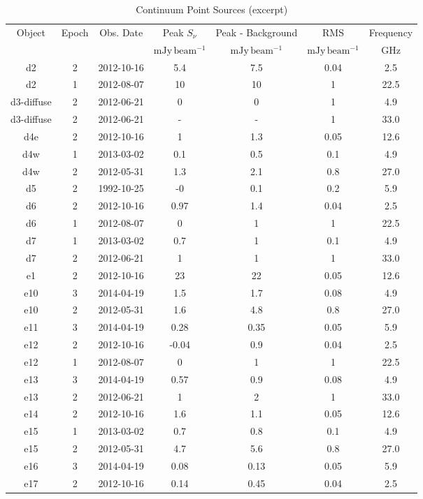 \begin{table*}[htp]
\caption{Continuum Point Sources (excerpt)}
\begin{tabular}{ccccccc}
\label{tab:contsrcs}
Object & Epoch & Obs. Date & Peak $S_{\nu}$ & Peak - Background & RMS & Frequency \\
 &  &  & $\mathrm{mJy\,beam^{-1}}$ & $\mathrm{mJy\,beam^{-1}}$ & $\mathrm{mJy\,beam^{-1}}$ & $\mathrm{GHz}$ \\
\hline
d2 & 2 & 2012-10-16 & 5.4 & 7.5 & 0.04 & 2.5 \\
d2 & 1 & 2012-08-07 & 10 & 10 & 1 & 22.5 \\
d3-diffuse & 2 & 2012-06-21 & 0 & 0 & 1 & 4.9 \\
d3-diffuse & 2 & 2012-06-21 & - & - & 1 & 33.0 \\
d4e & 2 & 2012-10-16 & 1 & 1.3 & 0.05 & 12.6 \\
d4w & 1 & 2013-03-02 & 0.1 & 0.5 & 0.1 & 4.9 \\
d4w & 2 & 2012-05-31 & 1.3 & 2.1 & 0.8 & 27.0 \\
d5 & 2 & 1992-10-25 & -0 & 0.1 & 0.2 & 5.9 \\
d6 & 2 & 2012-10-16 & 0.97 & 1.4 & 0.04 & 2.5 \\
d6 & 1 & 2012-08-07 & 0 & 1 & 1 & 22.5 \\
d7 & 1 & 2013-03-02 & 0.7 & 1 & 0.1 & 4.9 \\
d7 & 2 & 2012-06-21 & 1 & 1 & 1 & 33.0 \\
e1 & 2 & 2012-10-16 & 23 & 22 & 0.05 & 12.6 \\
e10 & 3 & 2014-04-19 & 1.5 & 1.7 & 0.08 & 4.9 \\
e10 & 2 & 2012-05-31 & 1.6 & 4.8 & 0.8 & 27.0 \\
e11 & 3 & 2014-04-19 & 0.28 & 0.35 & 0.05 & 5.9 \\
e12 & 2 & 2012-10-16 & -0.04 & 0.9 & 0.04 & 2.5 \\
e12 & 1 & 2012-08-07 & 0 & 1 & 1 & 22.5 \\
e13 & 3 & 2014-04-19 & 0.57 & 0.9 & 0.08 & 4.9 \\
e13 & 2 & 2012-06-21 & 1 & 2 & 1 & 33.0 \\
e14 & 2 & 2012-10-16 & 1.6 & 1.1 & 0.05 & 12.6 \\
e15 & 1 & 2013-03-02 & 0.7 & 0.8 & 0.1 & 4.9 \\
e15 & 2 & 2012-05-31 & 4.7 & 5.6 & 0.8 & 27.0 \\
e16 & 3 & 2014-04-19 & 0.08 & 0.13 & 0.05 & 5.9 \\
e17 & 2 & 2012-10-16 & 0.14 & 0.45 & 0.04 & 2.5 \\

\end{tabular}
\end{table*}
